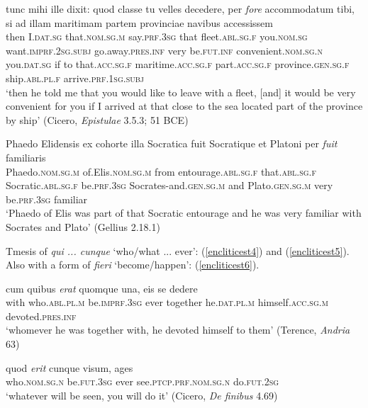 \begin{exe}
\ex
\gll tunc mihi ille dixit: quod classe tu velles decedere, per \emph{fore} accommodatum tibi, si ad illam maritimam partem provinciae navibus accessissem\\
then I.\textsc{dat.sg} that.\textsc{nom.sg.m} say.\textsc{prf.3sg} that fleet.\textsc{abl.sg.f} you.\textsc{nom.sg} want.\textsc{imprf.2sg.subj} go.away.\textsc{pres.inf} very be.\textsc{fut.inf} convenient.\textsc{nom.sg.n} you.\textsc{dat.sg} if to that.\textsc{acc.sg.f} maritime.\textsc{acc.sg.f} part.\textsc{acc.sg.f} province.\textsc{gen.sg.f} ship.\textsc{abl.pl.f} arrive.\textsc{prf.1sg.subj}\\  
\trans `then he told me that you would like to leave with a fleet, [and] it would be very convenient for you if I arrived at that close to the sea located part of the province by ship' (Cicero, \textit{Epistulae} 3.5.3; 51 BCE)
\label{encliticest2}
\end{exe}

\begin{exe}
\ex
\gll Phaedo Elidensis ex cohorte illa Socratica fuit Socratique et Platoni per \emph{fuit} familiaris\\
Phaedo.\textsc{nom.sg.m} of.Elis.\textsc{nom.sg.m} from entourage.\textsc{abl.sg.f} that.\textsc{abl.sg.f} Socratic.\textsc{abl.sg.f} be.\textsc{prf.3sg} Socrates-and.\textsc{gen.sg.m} and Plato.\textsc{gen.sg.m} very be.\textsc{prf.3sg} familiar\\ 
\trans `Phaedo of Elis was part of that Socratic entourage and he was very familiar with Socrates and Plato' (Gellius 2.18.1)
\label{encliticest3}
\end{exe}

Tmesis of \emph{qui ... cunque} `who/what ... ever': (\ref{encliticest4}) and (\ref{encliticest5}). Also with a form of \emph{fieri} `become/happen': (\ref{encliticest6}).

\begin{exe}
\ex
\gll cum quibus \emph{erat} quomque una, eis se dedere\\
with who.\textsc{abl.pl.m} be.\textsc{imprf.3sg} ever together he.\textsc{dat.pl.m} himself.\textsc{acc.sg.m} devoted.\textsc{pres.inf}\\ 
\trans `whomever he was together with, he devoted himself to them' (Terence, \textit{Andria} 63)
\label{encliticest4}
\end{exe}

\begin{exe}
\ex
\gll quod \emph{erit} cunque visum, ages\\
who.\textsc{nom.sg.n} be.\textsc{fut.3sg} ever see.\textsc{ptcp.prf.nom.sg.n} do.\textsc{fut.2sg}\\
\trans `whatever will be seen, you will do it' (Cicero, \textit{De finibus} 4.69)
\label{encliticest5}
\end{exe}

